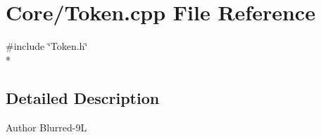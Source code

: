 \section{Core/\-Token.cpp File Reference}
\label{_token_8cpp}
{\ttfamily \#include \char`\"{}Token.\-h\char`\"{}}\\*


\subsection{Detailed Description}
\begin{DoxyAuthor}{Author}
Blurred-\/9\-L 
\end{DoxyAuthor}
